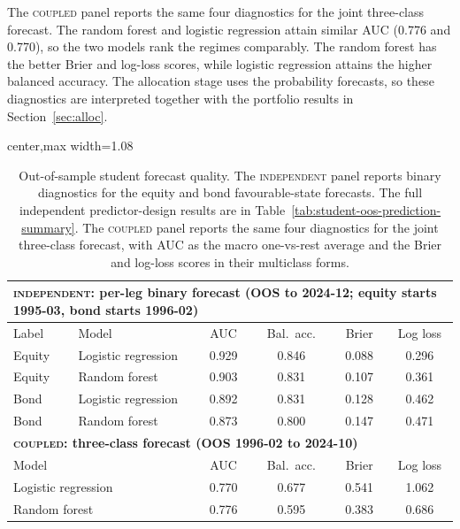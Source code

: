 \documentclass[10pt]{article}
\newcommand{\Acoup}{\textsc{coupled}}
\newcommand{\Bindep}{\textsc{independent}}
\begin{document}
The \Acoup{} panel reports the same four diagnostics for the joint three-class forecast. The
random forest and logistic regression attain similar AUC (0.776 and 0.770), so the two models
rank the regimes comparably. The random forest has the better Brier and log-loss scores, while
logistic regression attains the higher balanced accuracy. The allocation stage uses the
probability forecasts, so these diagnostics are interpreted together with the portfolio results
in Section~\ref{sec:alloc}.

\begin{table}[H]
\centering
\caption{Out-of-sample student forecast quality. The \Bindep{} panel reports binary
diagnostics for the equity and bond favourable-state forecasts. The full independent
predictor-design results are in Table~\ref{tab:student-oos-prediction-summary}. The
\Acoup{} panel reports the same four diagnostics for the joint three-class forecast, with
AUC as the macro one-vs-rest average and the Brier and log-loss scores in their multiclass
forms.}
\label{tab:forecast}
\small
\begin{adjustbox}{center,max width=1.08\textwidth}
\begin{tabular}{llcccc}
\toprule
\multicolumn{6}{l}{\textbf{\Bindep{}: per-leg binary forecast (OOS to 2024-12; equity starts 1995-03, bond starts 1996-02)}}\\
\midrule
Label & Model & AUC & Bal.\ acc. & Brier & Log loss \\
\midrule
Equity & Logistic regression & 0.929 & 0.846 & 0.088 & 0.296 \\
Equity & Random forest       & 0.903 & 0.831 & 0.107 & 0.361 \\
Bond   & Logistic regression & 0.892 & 0.831 & 0.128 & 0.462 \\
Bond   & Random forest       & 0.873 & 0.800 & 0.147 & 0.471 \\
\midrule
\multicolumn{6}{l}{\textbf{\Acoup{}: three-class forecast (OOS 1996-02 to 2024-10)}}\\
\midrule
\multicolumn{2}{l}{Model} & AUC & Bal.\ acc. & Brier & Log loss \\
\midrule
\multicolumn{2}{l}{Logistic regression} & 0.770 & 0.677 & 0.541 & 1.062 \\
\multicolumn{2}{l}{Random forest}       & 0.776 & 0.595 & 0.383 & 0.686 \\
\bottomrule
\end{tabular}
\end{adjustbox}
\end{table}
\end{document}
